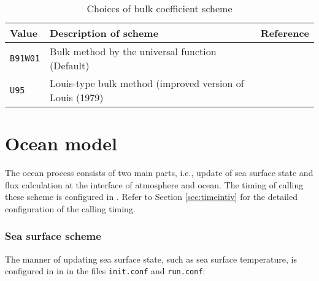 \begin{table}[h]
\begin{center}
  \caption{Choices of bulk coefficient scheme}
  \label{tab:nml_bulk}
  \begin{tabularx}{150mm}{llX} \hline
    \rowcolor[gray]{0.9}  Value & Description of scheme & Reference\\ \hline
      \verb|B91W01| & Bulk method by the universal function (Default) & \citet{beljaars_1991,wilson_2001} \\
      \verb|U95|    & Louis-type bulk method  (improved version of Louis (1979) & \citet{uno_1995} \\
    \hline
  \end{tabularx}
\end{center}
\end{table}

\section{Ocean model} \label{sec:basic_usel_ocean}
The ocean process consists of two main parts, i.e., update of sea surface state and flux calculation at the interface of atmosphere and ocean. The timing of calling these scheme is configured in . Refer to Section \ref{sec:timeintiv} for the detailed configuration of the calling timing.

\subsubsection{Sea surface scheme}
The manner of updating sea surface state, such as sea surface temperature, is configured in  in  in the files \verb|init.conf| and \verb|run.conf|:

